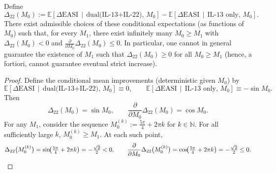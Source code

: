 ﻿\begin{proposition}\label{prop-no-eventual-positivity}
Define
\[
\Delta_{22}(M_0):=\mathbb{E}\!\left[\Delta\mathrm{EASI}\,\middle|\,\text{dual(IL-13+IL-22)},\, M_0\right]-\mathbb{E}\!\left[\Delta\mathrm{EASI}\,\middle|\,\text{IL-13 only},\, M_0\right].
\]
There exist admissible choices of these conditional expectations (as functions of $M_0$) such that, for every $M_1$, there exist infinitely many $M_0\ge M_1$ with $\Delta_{22}(M_0)<0$ and $\tfrac{\partial}{\partial M_0}\Delta_{22}(M_0)\le 0$. In particular, one cannot in general guarantee the existence of $M_1$ such that $\Delta_{22}(M_0)\ge 0$ for all $M_0\ge M_1$ (hence, a fortiori, cannot guarantee eventual strict increase).
\end{proposition}

\begin{proof}
Define the conditional mean improvements (deterministic given $M_0$) by
\[
\mathbb{E}\!\left[\Delta\mathrm{EASI}\,\middle|\, \text{dual(IL-13+IL-22)},\, M_0\right]\equiv 0,\qquad
\mathbb{E}\!\left[\Delta\mathrm{EASI}\,\middle|\, \text{IL-13 only},\, M_0\right]\equiv -\sin M_0.
\]
Then
\[
\Delta_{22}(M_0)=\sin M_0,\qquad \frac{\partial}{\partial M_0}\Delta_{22}(M_0)=\cos M_0.
\]
For any $M_1$, consider the sequence $M_0^{(k)}:=\tfrac{5\pi}{4}+2\pi k$ for $k\in\mathbb{N}$. For all sufficiently large $k$, $M_0^{(k)}\ge M_1$. At each such point,
\[
\Delta_{22}\bigl(M_0^{(k)}\bigr)=\sin\!\bigl(\tfrac{5\pi}{4}+2\pi k\bigr)=-\tfrac{\sqrt{2}}{2}<0,\qquad
\frac{\partial}{\partial M_0}\Delta_{22}\bigl(M_0^{(k)}\bigr)=\cos\!\bigl(\tfrac{5\pi}{4}+2\pi k\bigr)=-\tfrac{\sqrt{2}}{2}\le 0.\qedhere
\]
\end{proof}
